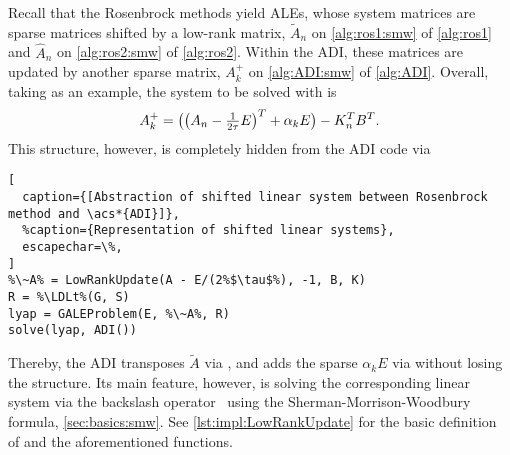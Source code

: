 Recall that the Rosenbrock methods yield \acp{ALE},
whose system matrices are sparse matrices shifted by a low-rank matrix,
\cf $\tilde A_n$ on \autoref{alg:ros1:smw} of \autoref{alg:ros1} and $\hat A_n$ on \autoref{alg:ros2:smw} of \autoref{alg:ros2}.
Within the \ac{ADI}, these matrices are updated by another sparse matrix,
\cf $A^+_k$ on \autoref{alg:ADI:smw} of \autoref{alg:ADI}.
Overall, taking  as an example,
the system to be solved with is
\begin{equation}
  A_k^+ =
  \big(\big( A_n - \tfrac{1}{2\tau} E \big)^T + \alpha_k E \big) - K_n^T B^T
  .
\end{equation}
This structure, however, is completely hidden from the \ac{ADI} code via
\begin{lstlisting}[
  caption={[Abstraction of shifted linear system between Rosenbrock method and \acs*{ADI}]},
  %caption={Representation of shifted linear systems},
  escapechar=\%,
]
%\~A% = LowRankUpdate(A - E/(2%$\tau$%), -1, B, K)
R = %\LDLt%(G, S)
lyap = GALEProblem(E, %\~A%, R)
solve(lyap, ADI())
\end{lstlisting}
Thereby, the \ac{ADI} transposes $\tilde A$ via ,
and adds the sparse $\alpha_k E$ via \julia{(+)} without losing the  structure.
Its main feature, however, is solving the corresponding linear system via the backslash operator~\julia{(\textbackslash)}
using the Sherman-Morrison-Woodbury formula,
\cf \autoref{sec:basics:smw}.
See \autoref{lst:impl:LowRankUpdate} for the basic definition of  and the aforementioned functions.


